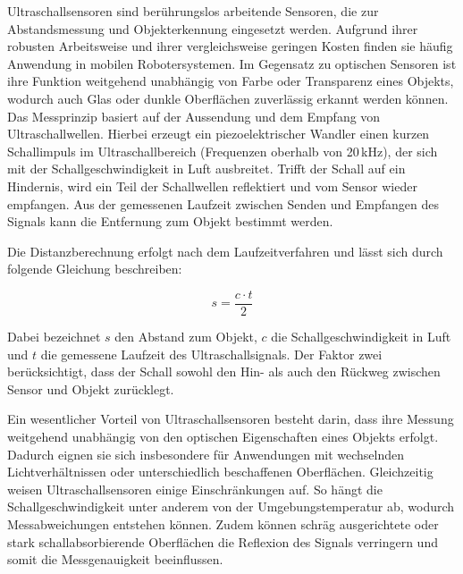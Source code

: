 Ultraschallsensoren sind berührungslos arbeitende Sensoren, die zur Abstandsmessung und Objekterkennung eingesetzt werden. Aufgrund ihrer robusten Arbeitsweise und ihrer vergleichsweise geringen Kosten finden sie häufig Anwendung in mobilen Robotersystemen. Im Gegensatz zu optischen Sensoren ist ihre Funktion weitgehend unabhängig von Farbe oder Transparenz eines Objekts, wodurch auch Glas oder dunkle Oberflächen zuverlässig erkannt werden können. \cite{fraden2016sensors}
\cite{Doessel2016}
Das Messprinzip basiert auf der Aussendung und dem Empfang von Ultraschallwellen. Hierbei erzeugt ein piezoelektrischer Wandler einen kurzen Schallimpuls im Ultraschallbereich (Frequenzen oberhalb von 20\,kHz), der sich mit der Schallgeschwindigkeit in Luft ausbreitet. Trifft der Schall auf ein Hindernis, wird ein Teil der Schallwellen reflektiert und vom Sensor wieder empfangen. Aus der gemessenen Laufzeit zwischen Senden und Empfangen des Signals kann die Entfernung zum Objekt bestimmt werden.

Die Distanzberechnung erfolgt nach dem Laufzeitverfahren und lässt sich durch folgende Gleichung beschreiben:

\begin{equation}
	s = \frac{c \cdot t}{2}
	\label{eq:ultraschall}
\end{equation}

Dabei bezeichnet $s$ den Abstand zum Objekt, $c$ die Schallgeschwindigkeit in Luft und $t$ die gemessene Laufzeit des Ultraschallsignals. Der Faktor zwei berücksichtigt, dass der Schall sowohl den Hin- als auch den Rückweg zwischen Sensor und Objekt zurücklegt. \cite{Doessel2016}

Ein wesentlicher Vorteil von Ultraschallsensoren besteht darin, dass ihre Messung weitgehend unabhängig von den optischen Eigenschaften eines Objekts erfolgt. Dadurch eignen sie sich insbesondere für Anwendungen mit wechselnden Lichtverhältnissen oder unterschiedlich beschaffenen Oberflächen.  \cite{fraden2016sensors} Gleichzeitig weisen Ultraschallsensoren einige Einschränkungen auf. So hängt die Schallgeschwindigkeit unter anderem von der Umgebungstemperatur ab, wodurch Messabweichungen entstehen können. Zudem können schräg ausgerichtete oder stark schallabsorbierende Oberflächen die Reflexion des Signals verringern und somit die Messgenauigkeit beeinflussen.  \cite{fraden2016sensors} \cite{Doessel2016}


